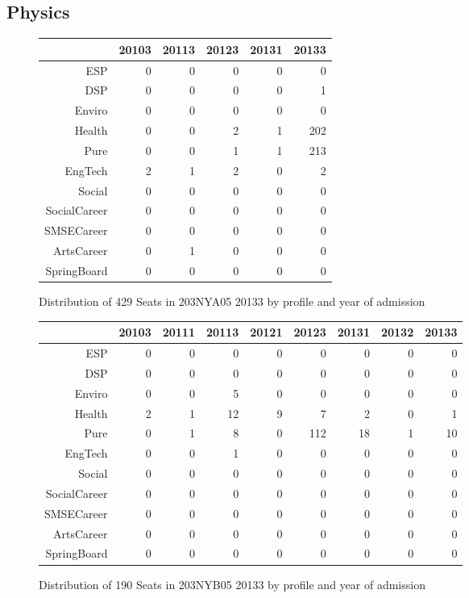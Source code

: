 \documentclass{article}\usepackage[]{graphicx}\usepackage[]{color}
\begin{document}
\subsection{Physics}
\begin{figure}[H]
\centering
\begin{tabular}{rrrrrr}
  \hline
 & 20103 & 20113 & 20123 & 20131 & 20133 \\ 
  \hline
ESP &   0 &   0 &   0 &   0 &   0 \\ 
  DSP &   0 &   0 &   0 &   0 &   1 \\ 
  Enviro &   0 &   0 &   0 &   0 &   0 \\ 
  Health &   0 &   0 &   2 &   1 & 202 \\ 
  Pure &   0 &   0 &   1 &   1 & 213 \\ 
  EngTech &   2 &   1 &   2 &   0 &   2 \\ 
  Social &   0 &   0 &   0 &   0 &   0 \\ 
  SocialCareer &   0 &   0 &   0 &   0 &   0 \\ 
  SMSECareer &   0 &   0 &   0 &   0 &   0 \\ 
  ArtsCareer &   0 &   1 &   0 &   0 &   0 \\ 
  SpringBoard &   0 &   0 &   0 &   0 &   0 \\ 
   \hline
\end{tabular}
\caption{Distribution of 429 Seats in 203NYA05 20133 by profile and year of admission} 
\end{figure}
\begin{figure}[H]
\centering
\begin{tabular}{rrrrrrrrr}
  \hline
 & 20103 & 20111 & 20113 & 20121 & 20123 & 20131 & 20132 & 20133 \\ 
  \hline
ESP &   0 &   0 &   0 &   0 &   0 &   0 &   0 &   0 \\ 
  DSP &   0 &   0 &   0 &   0 &   0 &   0 &   0 &   0 \\ 
  Enviro &   0 &   0 &   5 &   0 &   0 &   0 &   0 &   0 \\ 
  Health &   2 &   1 &  12 &   9 &   7 &   2 &   0 &   1 \\ 
  Pure &   0 &   1 &   8 &   0 & 112 &  18 &   1 &  10 \\ 
  EngTech &   0 &   0 &   1 &   0 &   0 &   0 &   0 &   0 \\ 
  Social &   0 &   0 &   0 &   0 &   0 &   0 &   0 &   0 \\ 
  SocialCareer &   0 &   0 &   0 &   0 &   0 &   0 &   0 &   0 \\ 
  SMSECareer &   0 &   0 &   0 &   0 &   0 &   0 &   0 &   0 \\ 
  ArtsCareer &   0 &   0 &   0 &   0 &   0 &   0 &   0 &   0 \\ 
  SpringBoard &   0 &   0 &   0 &   0 &   0 &   0 &   0 &   0 \\ 
   \hline
\end{tabular}
\caption{Distribution of 190 Seats in 203NYB05 20133 by profile and year of admission} 
\end{figure}
\end{document}
